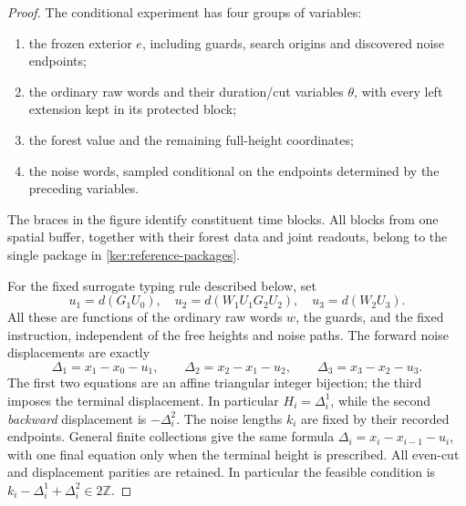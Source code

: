 \documentclass[11pt]{article}
\numberwithin{equation}{section}
\theoremstyle{definition}
\theoremstyle{remark}
\newcommand{\1}{\mathbf 1}
\begin{document}
\begin{proof}
The conditional experiment has four groups of variables:
\begin{enumerate}[label=(\roman*)]
\item the frozen exterior \(e\), including guards, search origins and
      discovered noise endpoints;
\item the ordinary raw words and their duration/cut variables \(\theta\),
      with every left extension kept in its protected block;
\item the forest value and the remaining full-height coordinates;
\item the noise words, sampled conditional on the endpoints determined
      by the preceding variables.
\end{enumerate}
The braces in the figure identify constituent time blocks. All blocks
from one spatial buffer, together with their forest data and joint
readouts, belong to the single package in
\eqref{ker:reference-packages}.

For the fixed surrogate typing rule described below, set
\[
 u_1=d(G_1U_0),\quad
 u_2=d(W_1U_1G_2U_2),\quad u_3=d(W_2U_3).
\]
All these are functions of the ordinary raw words \(w\), the guards,
and the fixed instruction, independent of the free heights and
noise paths.  The forward noise displacements are exactly
\begin{equation}\label{ker:triangular-heights}
 \Delta_1=x_1-x_0-u_1,\qquad
 \Delta_2=x_2-x_1-u_2,\qquad
 \Delta_3=x_3-x_2-u_3.
\end{equation}
The first two equations are an affine triangular integer bijection;
the third imposes the terminal displacement.  In particular
\(H_i=\Delta_i^1\), while the second \emph{backward} displacement
is \(-\Delta_i^2\).  The noise lengths \(k_i\) are fixed by their
recorded endpoints.  General finite collections give the same formula
\(\Delta_i=x_i-x_{i-1}-u_i\), with one final equation only when the
terminal height is prescribed.  All even-cut and displacement parities
are retained.  In particular the feasible condition is
\(k_i-\Delta_i^1+\Delta_i^2\in2\mathbb Z\).


\end{proof}
\end{document}
